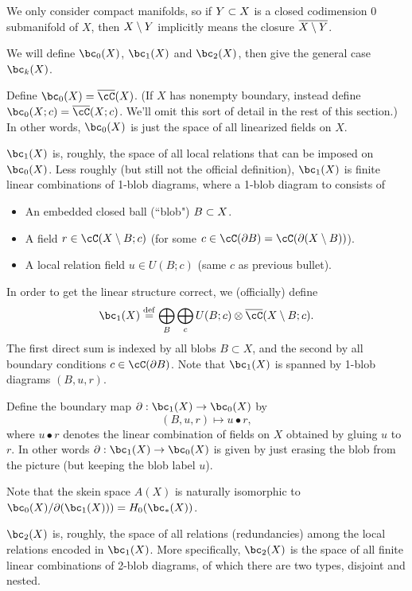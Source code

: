 \documentclass[11pt,leqno]{amsart}
\begin{document}
We only consider compact manifolds, so if $Y \subset X$ is a closed codimension 0
submanifold of $X$, then $X \setminus Y$ implicitly means the closure
$\overline{X \setminus Y}$.

We will define $\bc_0(X)$, $\bc_1(X)$ and $\bc_2(X)$, then give the general case $\bc_k(X)$.

Define $\bc_0(X) = \lf(X)$.
(If $X$ has nonempty boundary, instead define $\bc_0(X; c) = \lf(X; c)$.
We'll omit this sort of detail in the rest of this section.)
In other words, $\bc_0(X)$ is just the space of all linearized fields on $X$.

$\bc_1(X)$ is, roughly, the space of all local relations that can be imposed on $\bc_0(X)$.
Less roughly (but still not the official definition), $\bc_1(X)$ is finite linear
combinations of 1-blob diagrams, where a 1-blob diagram to consists of
\begin{itemize}
\item An embedded closed ball (``blob") $B \subset X$.
\item A field $r \in \cC(X \setmin B; c)$
(for some $c \in \cC(\bd B) = \cC(\bd(X \setmin B))$).
\item A local relation field $u \in U(B; c)$
(same $c$ as previous bullet).
\end{itemize}
In order to get the linear structure correct, we (officially) define
\[
	\bc_1(X) \deq \bigoplus_B \bigoplus_c U(B; c) \otimes \lf(X \setmin B; c) .
\]
The first direct sum is indexed by all blobs $B\subset X$, and the second
by all boundary conditions $c \in \cC(\bd B)$.
Note that $\bc_1(X)$ is spanned by 1-blob diagrams $(B, u, r)$.

Define the boundary map $\bd : \bc_1(X) \to \bc_0(X)$ by 
\[ 
	(B, u, r) \mapsto u\bullet r, 
\]
where $u\bullet r$ denotes the linear
combination of fields on $X$ obtained by gluing $u$ to $r$.
In other words $\bd : \bc_1(X) \to \bc_0(X)$ is given by
just erasing the blob from the picture
(but keeping the blob label $u$).

Note that the skein space $A(X)$
is naturally isomorphic to $\bc_0(X)/\bd(\bc_1(X))) = H_0(\bc_*(X))$.

$\bc_2(X)$ is, roughly, the space of all relations (redundancies) among the 
local relations encoded in $\bc_1(X)$.
More specifically, $\bc_2(X)$ is the space of all finite linear combinations of
2-blob diagrams, of which there are two types, disjoint and nested.
\end{document}
